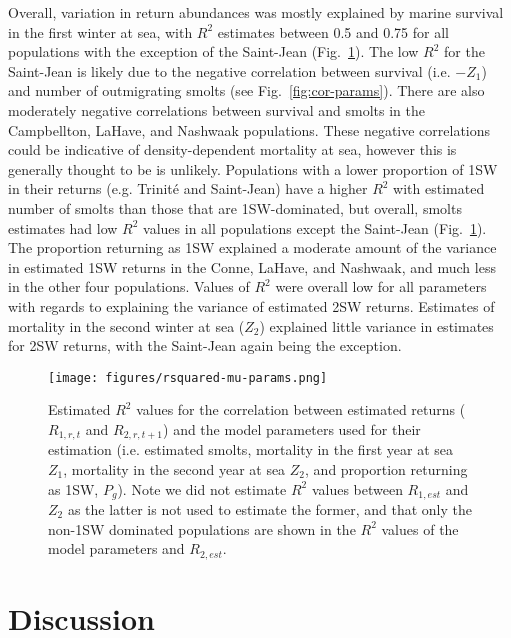 \documentclass[12pt]{article}
\newcommand{\Pg}{$P_g$\xspace}
\begin{document}
Overall, variation in return abundances was mostly explained by marine survival in the
first winter at sea, with $R^2$ estimates between 0.5 and 0.75 for all populations
with the exception of the Saint-Jean (Fig.~\ref{fig:mu-rsq}).
The low $R^2$ for the Saint-Jean is likely due to the negative correlation
between survival (i.e. $-Z_1$) and number of outmigrating smolts (see Fig.~\ref{fig:cor-params}). 
There are also moderately negative correlations between survival and smolts in
the Campbellton, LaHave, and Nashwaak populations.
These negative correlations could be indicative of density-dependent
mortality at sea, however this is generally thought to be is unlikely.
Populations with a lower proportion of 1SW in their returns (e.g. Trinit\'{e}
and Saint-Jean) have a higher $R^2$ with estimated number of smolts than those
that are 1SW-dominated, but overall, smolts estimates had low $R^2$ values in 
all populations except the Saint-Jean (Fig.~\ref{fig:mu-rsq}).
The proportion returning as 1SW explained a moderate amount of the variance in
estimated 1SW returns in the Conne, LaHave, and Nashwaak, and much less in the
other four populations.
Values of $R^2$ were overall low for all parameters with regards to explaining
the variance of estimated 2SW returns. Estimates of mortality in the second winter at sea ($Z_2$)
explained little variance in estimates for 2SW returns, with the Saint-Jean again being the
exception.

\begin{figure}[htbp] \centering
    \texttt{[image: figures/rsquared-mu-params.png]}
    \caption{Estimated $R^2$ values for the correlation between estimated
        returns ($R_{1,r,t}$ and $R_{2,r,t+1}$) and the model parameters used
        for their estimation (i.e. estimated smolts, mortality in the first
        year at sea $Z_1$, mortality in the second year at sea $Z_2$, and
        proportion returning as 1SW, \Pg). Note we did not estimate $R^2$
        values between $R_{1,est}$ and $Z_2$ as the latter is not used to
        estimate the former, and that only the non-1SW dominated populations are
        shown in the $R^2$ values of the model parameters and $R_{2,est}$.}
    \label{fig:mu-rsq} 
\end{figure}


\section*{Discussion} 

\end{document}
